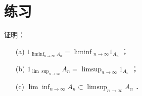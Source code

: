 
\section{练习}

\begin{exercise}
    证明：
    \begin{enumerate}
        \item[(a)] $1_{\liminf _{n \rightarrow \infty} A_n}=\liminf { }_{n \rightarrow \infty} 1_{A_n}$ ；
        \item[(b)] $1_{\lim \sup _{n \rightarrow \infty}} A_n=\limsup_{n \rightarrow \infty} 1_{A_n}$ ；
        \item[(c)] $\lim \inf _{n \rightarrow \infty} A_n \subset \limsup _{n \rightarrow \infty} A_n$ ．
    \end{enumerate}
\end{exercise}

